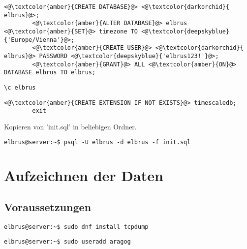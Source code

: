 \documentclass{article}
\begin{document}
	\lstset{style=files}
	\begin{lstlisting}[caption={Auführen von SQL Befehlen.}, numbers=none]
		<@\textcolor{amber}{CREATE DATABASE}@> <@\textcolor{darkorchid}{ elbrus}@>;
		<@\textcolor{amber}{ALTER DATABASE}@> elbrus <@\textcolor{amber}{SET}@> timezone TO <@\textcolor{deepskyblue}{'Europe/Vienna'}@>;
		<@\textcolor{amber}{CREATE USER}@> <@\textcolor{darkorchid}{ elbrus}@> PASSWORD <@\textcolor{deepskyblue}{'elbrus123!'}@>;
		<@\textcolor{amber}{GRANT}@> ALL <@\textcolor{amber}{ON}@> DATABASE elbrus TO elbrus;
	\end{lstlisting}
	
	\begin{lstlisting}[caption={Wechseln zu erstellter Datenbank}, numbers=none]
		\c elbrus
	\end{lstlisting}

	\begin{lstlisting}[caption={Hinzufügen der TimescaleDB Erweiterung.}, numbers=none]
		<@\textcolor{amber}{CREATE EXTENSION IF NOT EXISTS}@> timescaledb;
		exit
	\end{lstlisting}
	Kopieren von 'init.sql' in beliebigen Ordner.

	\lstset{style=commands}
	\begin{lstlisting}[caption={Anlegen der benötigten Tabellen duch das ausführen von 'init.sql'.}]
		elbrus@server:~$ psql -U elbrus -d elbrus -f init.sql
	\end{lstlisting}
	
	\newpage
	
	\section{Aufzeichnen der Daten}
	\subsection[dependencies]{Voraussetzungen}
	\lstset{style=commands}
	\begin{lstlisting}[caption={Installieren von 'tcpdump' für das aufzeichnen von Daten.}]
		elbrus@server:~$ sudo dnf install tcpdump
	\end{lstlisting}

	\begin{lstlisting}[caption={Anlegen eines Users der Berechtigungen zum ausführen von 'tcpdump' erhält.}]
		elbrus@server:~$ sudo useradd aragog
	\end{lstlisting}
	
\end{document}
